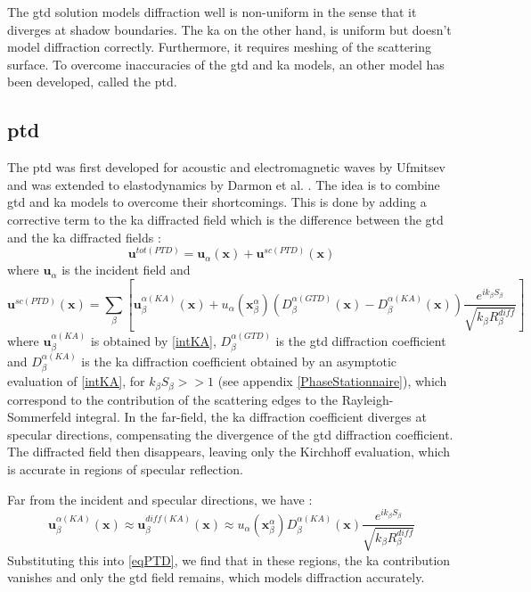 The \acrshort{gtd} solution models diffraction well is non-uniform in the sense that it diverges at shadow boundaries. The \acrshort{ka} on the other hand, is uniform but doesn't model diffraction correctly. Furthermore, it requires meshing of the scattering surface. To overcome inaccuracies of the \acrshort{gtd} and \acrshort{ka} models, an other model has been developed, called the \acrfull{ptd}.

\subsection{\acrfull{ptd}}
The \acrfull{ptd} was first developed for acoustic and electromagnetic waves by Ufmitsev \cite{Ufmi} and was extended to elastodynamics by Darmon et al. \cite{DarmonKA}. The idea is to combine \acrshort{gtd} and \acrshort{ka} models to overcome their shortcomings. This is done by adding a corrective term to the \acrshort{ka} diffracted field which is the difference between the \acrshort{gtd} and the \acrshort{ka} diffracted fields :
\begin{equation}
\mathbf{u}^{tot (PTD)}=\mathbf{u}_{\alpha}(\mathbf{x})+\mathbf{u}^{sc (PTD)}(\mathbf{x})
\end{equation}
where $\mathbf{u}_{\alpha}$ is the incident field and
\begin{equation}
\mathbf{u}^{sc (PTD)}(\mathbf{x})=\sum_{\beta}\left[\mathbf{u}^{\alpha(KA)}_{\beta}(\mathbf{x})+u_{\alpha}(\mathbf{x}_{\beta}^{\alpha})\left(D_{\beta}^{\alpha(GTD)}(\mathbf{x})-D_{\beta}^{\alpha(KA)}(\mathbf{x})\right)\dfrac{e^{ik_{\beta}S_{\beta}}}{\sqrt{k_{\beta}R_{\beta}^{diff}}}\right]
\label{eqPTD}
\end{equation}
where  $\mathbf{u}^{\alpha(KA)}_{\beta}$ is obtained by \eqref{intKA}, $D_{\beta}^{\alpha(GTD)}$ is the \acrshort{gtd} diffraction coefficient and $D_{\beta}^{\alpha(KA)}$ is the \acrshort{ka} diffraction coefficient obtained by an asymptotic evaluation of \eqref{intKA}, for $k_{\beta}S_{\beta}>>1$ (see appendix \ref{PhaseStationnaire}), which correspond to the contribution of the scattering edges to the Rayleigh-Sommerfeld integral. In the far-field, the \acrshort{ka} diffraction coefficient diverges at specular directions, compensating the divergence of the \acrshort{gtd} diffraction coefficient. The diffracted field then disappears, leaving only the Kirchhoff evaluation, which is accurate in regions of specular reflection.

Far from the incident and specular directions, we have :
\begin{equation}
\mathbf{u}_{\beta}^{\alpha(KA)}(\mathbf{x})\approx \mathbf{u}_{\beta}^{diff(KA)}(\mathbf{x}) \approx u_{\alpha}(\mathbf{x}_{\beta}^{\alpha})D_{\beta}^{\alpha(KA)}(\mathbf{x})\dfrac{e^{ik_{\beta}S_{\beta}}}{\sqrt{k_{\beta}R_{\beta}^{diff}}}
\end{equation}
Substituting this into \eqref{eqPTD}, we find that in these regions, the \acrshort{ka} contribution vanishes and only the \acrshort{gtd} field remains, which models diffraction accurately.

